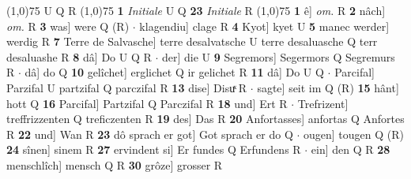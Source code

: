 \documentclass[8pt,a4paper,notitlepage]{article}
\begin{document}
\begin{table}[ht]
\begin{minipage}[t]{0.5\linewidth}
\begin{tabular}{rl}
\end{tabular}
\scriptsize
\line(1,0){75} \newline
U Q R \newline
\line(1,0){75} \newline
\textbf{1} \textit{Initiale} U Q  \textbf{23} \textit{Initiale} R  \newline
\line(1,0){75} \newline
\textbf{1} ê] \textit{om.} R \textbf{2} nâch] \textit{om.} R \textbf{3} was] were Q (R)  $\cdot$ klagendiu] clage R \textbf{4} Kyot] kyet U \textbf{5} manec werder] werdig R \textbf{7} Terre de Salvasche] terre desalvatsche U terre desaluasche Q terr desaluashe R \textbf{8} dâ] Do U Q R  $\cdot$ der] die U \textbf{9} Segremors] Segermors Q Segremurs R  $\cdot$ dâ] do Q \textbf{10} gelîchet] erglichet Q ir gelichet R \textbf{11} dâ] Do U Q  $\cdot$ Parcifal] Parzifal U partzifal Q parczifal R \textbf{13} dise] Disuͯ R  $\cdot$ sagte] seit im Q (R) \textbf{15} hânt] hott Q \textbf{16} Parcifal] Partzifal Q Parczifal R \textbf{18} und] Ert R  $\cdot$ Trefrizent] treffrizzenten Q treficzenten R \textbf{19} des] Das R \textbf{20} Anfortasses] anfortas Q Anfortes R \textbf{22} und] Wan R \textbf{23} dô sprach er got] Got sprach er do Q  $\cdot$ ougen] tougen Q (R) \textbf{24} sînen] sinem R \textbf{27} ervindent si] Er fundes Q Erfundens R  $\cdot$ ein] den Q R \textbf{28} menschlîch] mensch Q R \textbf{30} grôze] grosser R \newline
\end{minipage}
\end{table}
\end{document}
